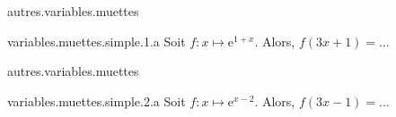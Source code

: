 \begin{qcm}{autres.variables.muettes}
    \begin{question}{variables.muettes.simple.1.a}
        Soit \(f\colon x\mapsto\mathrm{e}^{1+x}\). Alors, \(f(3x+1)=\ldots\)
        \vspace{-1.5ex}
         \begin{multicols}{2}
         \begin{reponses}
         \end{reponses}
     \end{multicols}
    \end{question}
\end{qcm}


\begin{qcm}{autres.variables.muettes}
    \begin{question}{variables.muettes.simple.2.a}
        Soit \(f\colon x\mapsto\mathrm{e}^{x-2}\). Alors, \(f(3x-1)=\ldots\)
        \vspace{-1.5ex}
         \begin{multicols}{2}
         \begin{reponses}
         \end{reponses}
        \end{multicols}
    \end{question}
\end{qcm}